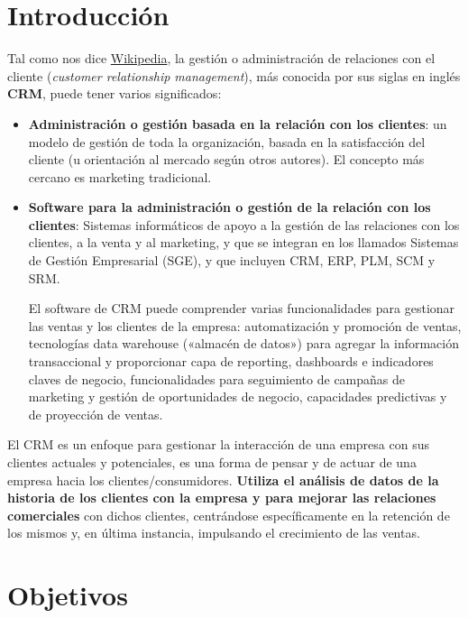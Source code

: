 \chapter{Introducción}

Tal como nos dice \href{https://es.wikipedia.org/wiki/Gesti%C3%B3n_de_Relaciones_con_el_Cliente}{Wikipedia}, la gestión o administración de relaciones con el cliente (\textit{customer relationship management}), más conocida por sus siglas en inglés \textbf{CRM}, puede tener varios significados:

\begin{itemize}
    \item \textbf{Administración o gestión basada en la relación con los clientes}: un modelo de gestión de toda la organización, basada en la satisfacción del cliente (u orientación al mercado según otros autores). El concepto más cercano es marketing tradicional.

    \item \textbf{Software para la administración o gestión de la relación con los clientes}: Sistemas informáticos de apoyo a la gestión de las relaciones con los clientes, a la venta y al marketing, y que se integran en los llamados Sistemas de Gestión Empresarial (SGE), y que incluyen CRM, ERP, PLM, SCM y SRM.

    El software de CRM puede comprender varias funcionalidades para gestionar las ventas y los clientes de la empresa: automatización y promoción de ventas, tecnologías data warehouse («almacén de datos») para agregar la información transaccional y proporcionar capa de reporting, dashboards e indicadores claves de negocio, funcionalidades para seguimiento de campañas de marketing y gestión de oportunidades de negocio, capacidades predictivas y de proyección de ventas.
\end{itemize}

El CRM es un enfoque para gestionar la interacción de una empresa con sus clientes actuales y potenciales, es una forma de pensar y de actuar de una empresa hacia los clientes/consumidores. \textbf{Utiliza el análisis de datos de la historia de los clientes con la empresa y para mejorar las relaciones comerciales} con dichos clientes, centrándose específicamente en la retención de los mismos y, en última instancia, impulsando el crecimiento de las ventas.


\chapter{Objetivos}

